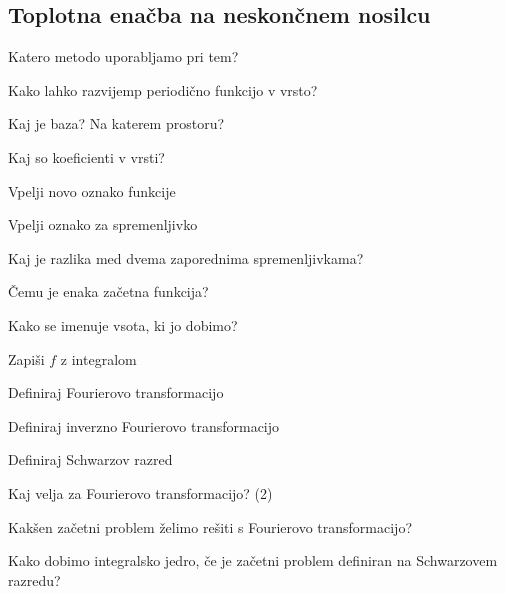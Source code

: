 \documentclass{article}
\begin{document}
    \subsection{Toplotna enačba na neskončnem nosilcu}
    \begin{enumerate}
        \item Katero metodo uporabljamo pri tem?
        {\color{red}\item Kako lahko razvijemp periodično funkcijo v vrsto?}
        {\color{red}\item Kaj je baza? Na katerem prostoru?}
        {\color{red}\item Kaj so koeficienti v vrsti?}
        {\color{red}\item Vpelji novo oznako funkcije}
        {\color{red}\item Vpelji oznako za spremenljivko}
        \item Kaj je razlika med dvema zaporednima spremenljivkama?
        \item Čemu je enaka začetna funkcija?
        {\color{red}\item Kako se imenuje vsota, ki jo dobimo?}
        {\color{red}\item Zapiši $f$ z integralom}
        {\color{red}\item Definiraj Fourierovo transformacijo}
        {\color{red}\item Definiraj inverzno Fourierovo transformacijo}
        {\color{red}\item Definiraj Schwarzov razred}
        {\color{red}\item Kaj velja za Fourierovo transformacijo? (2)}
        \item Kakšen začetni problem želimo rešiti s Fourierovo transformacijo?
        {\color{red}\item Kako dobimo integralsko jedro, če je začetni problem definiran na Schwarzovem razredu?}
    \end{enumerate}
\end{document}
